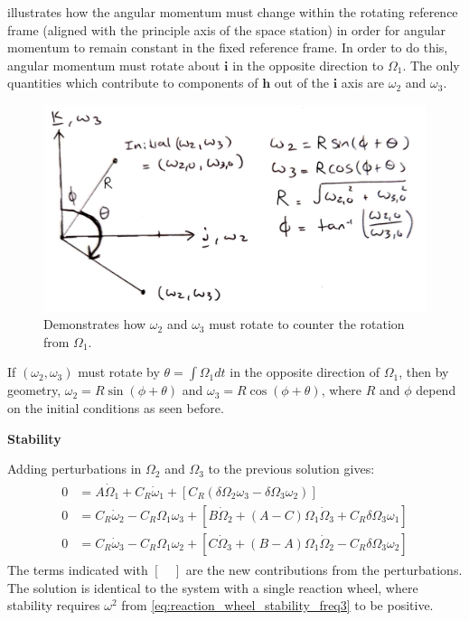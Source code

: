 \documentclass[12]{article}
\begin{document}
\begin{multicols*}{2}
 illustrates how the angular momentum must change within the rotating reference frame (aligned with the principle axis of the space station) in order for angular momentum to remain constant in the fixed reference frame. In order to do this, angular momentum must rotate about $\bm{i}$ in the opposite direction to $\Omega_1$. The only quantities which contribute to components of $\bm{h}$ out of the $\bm{i}$ axis are $\omega_2$ and $\omega_3$.

\begin{figure}[H]
\centering
\includegraphics[width=\linewidth]{fig/vector_diagram2.jpg}
\vspace{-0.3cm}
\caption{\label{fig:vector_diagram2}Demonstrates how $\omega_2$ and $\omega_3$ must rotate to counter the rotation from $\Omega_1$.}
\end{figure}

If $(\omega_2, \omega_3)$ must rotate by $\theta = \int\Omega_1 dt$ in the opposite direction of $\Omega_1$, then by geometry, $\omega_2 = R\sin(\phi + \theta)$ and $\omega_3 = R\cos(\phi + \theta)$, where $R$ and $\phi$ depend on the initial conditions as seen before.

\vfill\null
\columnbreak

\textbf{Stability}

Adding perturbations in $\Omega_2$ and $\Omega_3$ to the previous solution gives:
\begin{align} \label{eq:reaction_smart_stability}
\begin{split}
0 &= A\dot{\Omega}_1 + C_R\dot{\omega}_1 +
[C_R(\delta\Omega_2\omega_3 - \delta\Omega_3\omega_2)] \\
0 &= C_R\dot{\omega}_2 - C_R\Omega_1\omega_3 +
[B\dot{\Omega}_2 + (A - C)\Omega_1\dot{\Omega}_3 + C_R\delta\Omega_3\omega_1] \\
0 &= C_R\dot{\omega}_3 - C_R\Omega_1\omega_2 +
[C\dot{\Omega}_3 + (B - A)\Omega_1\dot{\Omega}_2 - C_R\delta\Omega_3\omega_2]
\end{split}
\end{align}
The terms indicated with $[\quad]$ are the new contributions from the perturbations. The solution is identical to the system with a single reaction wheel, where stability requires $\omega^2$ from \cref{eq:reaction_wheel_stability_freq3} to be positive.


\end{multicols*}
\end{document}
